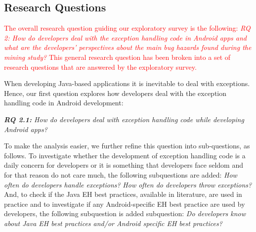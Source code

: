 

\subsection{Research Questions}

\textcolor{red}{The overall research question guiding our exploratory survey is
the following:
\emph{RQ 2: How do developers deal with the exception handling code in Android apps and what are the developers' perspectives about the main bug hazards found during the mining study?} This general research question has been broken into a set of research questions that are answered by the exploratory survey.}

When developing Java-based applications it is inevitable to deal with exceptions. Hence, our first question explores how developers deal with the exception handling code in Android development:

\emph{\textbf{RQ 2.1:} How do developers deal with exception handling code while developing Android apps?}

To make the analysis easier, we further refine this question into sub-questions, as follows. To investigate whether the development of exception handling code is a daily concern for developers or it is something that developers face seldom and for that reason do not care much, the following subquestions are added: \emph{How often do developers handle exceptions?} \emph{How often do developers throw exceptions?} And, to check if the Java EH best practices, available in literature, are used in practice and to investigate if any Android-specific EH best practice are used by developers, the following subquestion is added  subquestion: \emph{Do developers know about Java EH best practices and/or Android specific EH best practices?}

